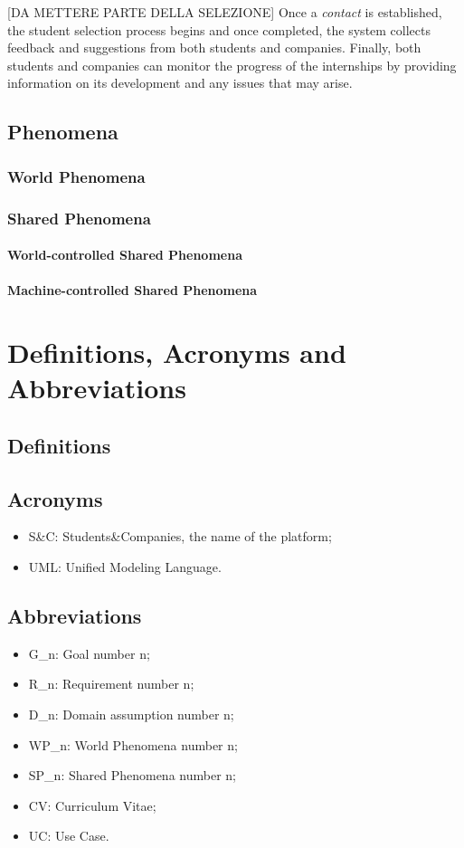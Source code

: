 		[DA METTERE PARTE DELLA SELEZIONE]
		Once a \emph{contact} is established, the student selection process begins and once completed, the system collects feedback and suggestions from both students and companies. Finally, both students and companies can monitor the progress of the internships by providing information on its development and any issues that may arise.
		\subsection{Phenomena}
			\subsubsection{World Phenomena}
			\subsubsection{Shared Phenomena}
				\paragraph{World-controlled Shared Phenomena}
				\paragraph{Machine-controlled Shared Phenomena}
	\section{Definitions, Acronyms and Abbreviations}
		\subsection{Definitions}
		\subsection{Acronyms}
			\begin{itemize}
				\item S\&C: Students\&Companies, the name of the platform;
				\item UML: Unified Modeling Language.
			\end{itemize}
		\subsection{Abbreviations}
			\begin{itemize}
				\item G\_n: Goal number n;
				\item R\_n: Requirement number n;
				\item D\_n: Domain assumption number n;
				\item WP\_n: World Phenomena number n;
				\item SP\_n: Shared Phenomena number n;
				\item CV: Curriculum Vitae;
				\item UC: Use Case.
			\end{itemize}
